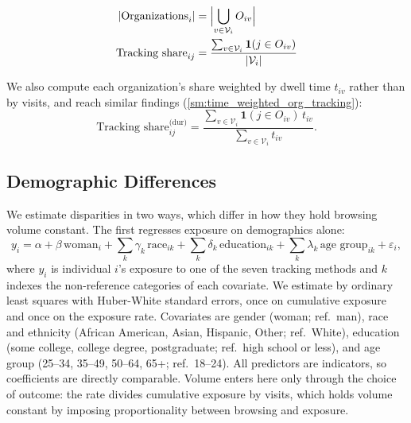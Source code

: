 \documentclass[12pt, letterpaper]{article}
\begin{document}
\begin{align}
\lvert \text{Organizations}_i \rvert &=
    \Bigl\lvert \bigcup_{v \in \mathcal{V}_i} O_{iv} \Bigr\rvert
    \label{eq:org_per_user} \\
\text{Tracking share}_{ij} &=
    \frac{\sum_{v \in \mathcal{V}_i} \mathbf{1}(j \in O_{iv})}
         {\lvert \mathcal{V}_i \rvert}
    \label{eq:ind_org_share_visits}
\end{align}
 
\noindent
We also compute each organization's share weighted by dwell time $t_{iv}$ rather than by visits, and reach similar findings (\cref{sm:time_weighted_org_tracking}):
\begin{equation}\label{eq:ind_org_share_duration}
\text{Tracking share}_{ij}^{\text{(dur)}} =
    \frac{\sum_{v \in \mathcal{V}_i} \mathbf{1}(j \in O_{iv})\, t_{iv}}
         {\sum_{v \in \mathcal{V}_i} t_{iv}}.
\end{equation}
 
\subsection{Demographic Differences}
\label{sec:demo_diff}
 
We estimate disparities in two ways, which differ in how they hold browsing volume constant.
The first regresses exposure on demographics alone:
\begin{equation}\label{eq:demo-diff}
     y_i =
     \alpha
     + \beta\, \text{woman}_i
     + \sum_{k} \gamma_k\, \text{race}_{ik}
     + \sum_{k} \delta_k\, \text{education}_{ik}
     + \sum_{k} \lambda_k\, \text{age group}_{ik}
     + \varepsilon_i,
\end{equation}
where $y_i$ is individual $i$'s exposure to one of the seven tracking methods and $k$ indexes the non-reference categories of each covariate.
We estimate by ordinary least squares with Huber-White standard errors, once on cumulative exposure and once on the exposure rate.
Covariates are gender (woman; ref.\ man), race and ethnicity (African American, Asian, Hispanic, Other; ref.\ White), education (some college, college degree, postgraduate; ref.\ high school or less), and age group (25--34, 35--49, 50--64, 65+; ref.\ 18--24).
All predictors are indicators, so coefficients are directly comparable.
Volume enters here only through the choice of outcome: the rate divides cumulative exposure by visits, which holds volume constant by imposing proportionality between browsing and exposure.
 
\end{document}
